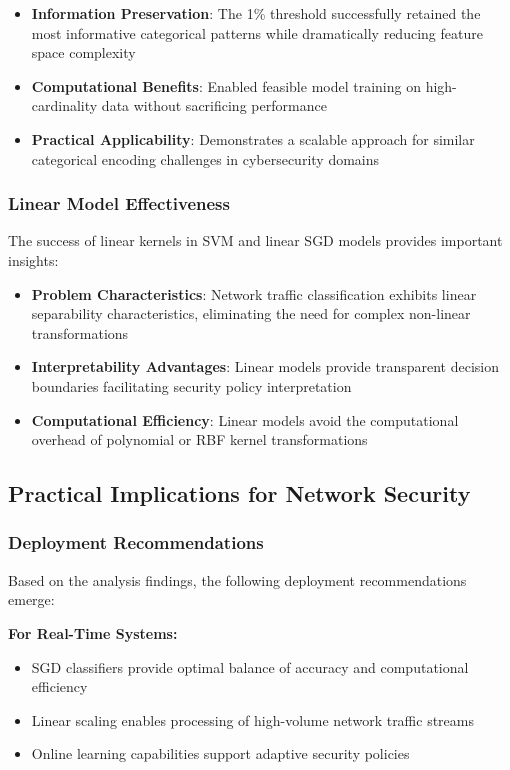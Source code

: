 \documentclass[12pt,a4paper]{article}
\begin{document}
\begin{itemize}
    \item \textbf{Information Preservation}: The 1\% threshold successfully retained the most informative categorical patterns while dramatically reducing feature space complexity
    \item \textbf{Computational Benefits}: Enabled feasible model training on high-cardinality data without sacrificing performance
    \item \textbf{Practical Applicability}: Demonstrates a scalable approach for similar categorical encoding challenges in cybersecurity domains
\end{itemize}

\subsubsection{Linear Model Effectiveness}

The success of linear kernels in SVM and linear SGD models provides important insights:

\begin{itemize}
    \item \textbf{Problem Characteristics}: Network traffic classification exhibits linear separability characteristics, eliminating the need for complex non-linear transformations
    \item \textbf{Interpretability Advantages}: Linear models provide transparent decision boundaries facilitating security policy interpretation
    \item \textbf{Computational Efficiency}: Linear models avoid the computational overhead of polynomial or RBF kernel transformations
\end{itemize}

\subsection{Practical Implications for Network Security}

\subsubsection{Deployment Recommendations}

Based on the analysis findings, the following deployment recommendations emerge:

\textbf{For Real-Time Systems:}
\begin{itemize}
    \item SGD classifiers provide optimal balance of accuracy and computational efficiency
    \item Linear scaling enables processing of high-volume network traffic streams
    \item Online learning capabilities support adaptive security policies
\end{itemize}
\end{document}

